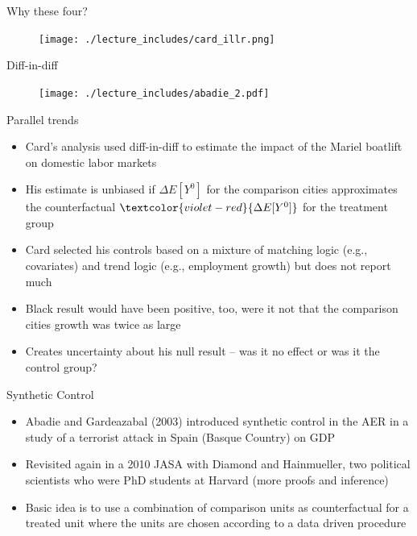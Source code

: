 \documentclass{beamer}
\begin{document}
\begin{frame}{Why these four?}

	\begin{figure}
	\texttt{[image: ./lecture\_includes/card\_illr.png]}
	\end{figure}

\end{frame}

\begin{frame}{Diff-in-diff}
	
	\begin{figure}
	\texttt{[image: ./lecture\_includes/abadie\_2.pdf]}
	\end{figure}
\end{frame}

\begin{frame}{Parallel trends}

\begin{itemize}
\item Card's analysis used diff-in-diff to estimate the impact of the Mariel boatlift on domestic labor markets
\item His estimate is unbiased if $\Delta E[Y^0]$ for the comparison cities approximates the counterfactual $\textcolor{violet-red}{\Delta E[Y^0]}$ for the treatment group
\item Card selected his controls based on a mixture of matching logic (e.g., covariates) and trend logic (e.g., employment growth) but does not report much
\item Black result would have been positive, too, were it not that the comparison cities growth was twice as large
\item Creates uncertainty about his null result -- was it no effect or was it the control group?
\end{itemize}

\end{frame}


\begin{frame}{Synthetic Control}
	
	\begin{itemize}
	\item Abadie and Gardeazabal (2003) introduced synthetic control in the AER in a study of a terrorist attack in Spain (Basque Country) on GDP
	\item Revisited again in a 2010 JASA with Diamond and Hainmueller, two political scientists who were PhD students at Harvard (more proofs and inference)
	\item Basic idea is to use a combination of comparison units as counterfactual for a treated unit where the units are chosen according to a data driven procedure
	\end{itemize}
\end{frame}
\end{document}

